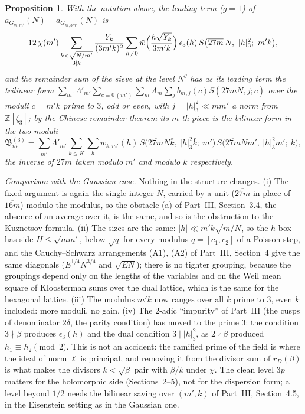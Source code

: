 \documentclass[11pt]{amsart}
\newtheorem{proposition}[theorem]{Proposition}
\theoremstyle{remark}
\newcommand{\Z}{\mathbb{Z}}
\begin{document}
\begin{proposition}\label{prop:eisdisp}
With the notation above, the leading term ($g=1$) of $a_{G_{m,m'}}(N)-a_{G_{m,3m'}}(N)$ is
\[
12\,\chi(m')\sum_{\substack{k<\sqrt{N/m'}\\ 3\nmid k}}\frac{Y_k}{(3m'k)^2}\sum_{h\ne0}\hat w\Bigl(\frac{h\sqrt{Y_k}}{3m'k}\Bigr)\,\epsilon_3(h)\,S\bigl(\overline{27m}\,N,\ |h|_3^2;\ m'k\bigr),
\]
and the remainder sum of the sieve at the level $N^\theta$ has as its leading term the trilinear form $\sum_{m'}\Lambda'_{m'}\sum_{c\equiv0\,(m')}\sum_m\Lambda_m\sum_jb_{m,j}(c)S(\overline{27m}N,j;c)$ over the moduli $c=m'k$ prime to $3$, odd or even, with $j=|h|_3^2\ll mm'$ a norm from $\Z[\zeta_3]$; by the Chinese remainder theorem its $m$-th piece is the bilinear form in the two moduli
\[
\mathfrak B^{(3)}_m=\sum_{m'}\Lambda'_{m'}\sum_{k\le K}\sum_hw_{k,m'}(h)\,S\bigl(\overline{27m}N\bar k,\ |h|_3^2\bar k;\ m'\bigr)\,S\bigl(\overline{27m}N\overline{m'},\ |h|_3^2\overline{m'};\ k\bigr),
\]
the inverse of $27m$ taken modulo $m'$ and modulo $k$ respectively.
\end{proposition}

\emph{Comparison with the Gaussian case.} Nothing in the structure changes. (i) The fixed argument is again the single integer $N$, carried by a unit ($\overline{27m}$ in place of $\overline{16m}$) modulo the modulus, so the obstacle (a) of Part~III, Section~3.4, the absence of an average over it, is the same, and so is the obstruction to the Kuznetsov formula. (ii) The sizes are the same: $|h|\ll m'k\sqrt{m/N}$, so the $h$-box has side $H\le\sqrt{mm'}$, below $\sqrt q$ for every modulus $q=[c_1,c_2]$ of a Poisson step, and the Cauchy--Schwarz arrangements (A1), (A2) of Part~III, Section~4 give the same diagonals ($E^{1/4}N^{3/4}$ and $\sqrt{EN}$); there is no tighter grouping, because the groupings depend only on the lengths of the variables and on the Weil mean square of Kloosterman sums over the dual lattice, which is the same for the hexagonal lattice. (iii) The modulus $m'k$ now ranges over all $k$ prime to $3$, even $k$ included: more moduli, no gain. (iv) The $2$-adic ``impurity'' of Part~III (the cusps of denominator $2\delta$, the parity condition) has moved to the prime $3$: the condition $3\nmid\beta$ produces $\epsilon_3(h)$ and the dual condition $3\mid|h|_3^2$, as $2\nmid\beta$ produced $h_1\equiv h_2\pmod2$. This is not an accident: the ramified prime of the field is where the ideal of norm $\ell$ is principal, and removing it from the divisor sum of $r_D(\beta)$ is what makes the divisors $k<\sqrt\beta$ pair with $\beta/k$ under $\chi$. The clean level $3p$ matters for the holomorphic side (Sections~2--5), not for the dispersion form; a level beyond $1/2$ needs the bilinear saving over $(m',k)$ of Part~III, Section~4.5, in the Eisenstein setting as in the Gaussian one.
\end{document}
